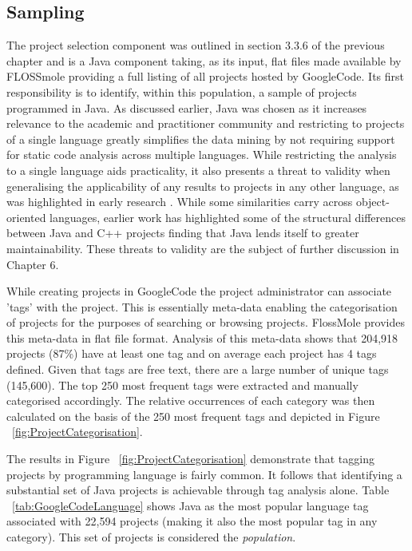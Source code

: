 \subsection{Sampling}
The project selection component was outlined in section 3.3.6 of the previous chapter and is a Java component taking, as its input, flat files made available by FLOSSmole providing a full listing of all projects hosted by GoogleCode. Its first responsibility is to identify, within this population, a sample of projects programmed in Java. As discussed earlier, Java was chosen as it increases relevance to the academic and practitioner community and restricting to projects of a single language greatly simplifies the data mining by not requiring support for static code analysis across multiple languages. While restricting the analysis to a single language aids practicality, it also presents a threat to validity when generalising the applicability of any results to projects in any other language, as was highlighted in early research \citep{basili1996validation}. While some similarities carry across object-oriented languages, earlier work has highlighted some of the structural differences between Java and C++ projects \citep{subramanyam2003empirical, english2009exploring} finding that Java lends itself to greater maintainability. These threats to validity are the subject of further discussion in Chapter 6.

While creating projects in GoogleCode the project administrator can associate 'tags' with the project. This is essentially meta-data enabling the categorisation of projects for the purposes of searching or browsing projects. FlossMole provides this meta-data in flat file format. Analysis of this meta-data shows that 204,918 projects (87\%) have at least one tag and on average each project has 4 tags defined. Given that tags are free text, there are a large number of unique tags (145,600). The top 250 most frequent tags were extracted and manually categorised accordingly. The relative occurrences of each category was then calculated on the basis of the 250 most frequent tags and depicted in Figure ~\ref{fig:ProjectCategorisation}. 

The results in Figure ~\ref{fig:ProjectCategorisation} demonstrate that tagging projects by programming language is fairly common. It follows that identifying a substantial set of Java projects is achievable through tag analysis alone. Table ~\ref{tab:GoogleCodeLanguage} shows Java as the most popular language tag associated with 22,594 projects (making it also the most popular tag in any category). This set of projects is considered the \textit{population}.

